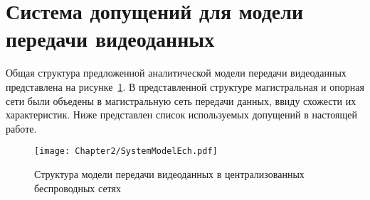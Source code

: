 \section{Система допущений для модели передачи видеоданных}
\label{chap2:Assumptions}

Общая структура предложенной аналитической модели передачи видеоданных представлена на рисунке~\ref{fig:SystemModel}. В представленной структуре магистральная и опорная сети были объедены в магистральную сеть передачи данных, ввиду схожести их характеристик. Ниже представлен список используемых допущений в настоящей работе.

\begin{figure}[htbp]
\begin{center}
\texttt{[image: Chapter2/SystemModelEch.pdf]}
\caption{Структура модели передачи видеоданных в централизованных беспроводных сетях}
\label{fig:SystemModel}
\end{center}
\end{figure}

